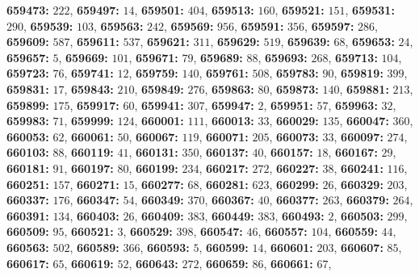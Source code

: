 \textsf{\bfseries 659473:} $222$, \textsf{\bfseries 659497:} $14$, \textsf{\bfseries 659501:} $404$, \textsf{\bfseries 659513:} $160$, \textsf{\bfseries 659521:} $151$, \textsf{\bfseries 659531:} $290$, \textsf{\bfseries 659539:} $103$, \textsf{\bfseries 659563:} $242$, \textsf{\bfseries 659569:} $956$, \textsf{\bfseries 659591:} $356$, \textsf{\bfseries 659597:} $286$, \textsf{\bfseries 659609:} $587$, \textsf{\bfseries 659611:} $537$, \textsf{\bfseries 659621:} $311$, \textsf{\bfseries 659629:} $519$, \textsf{\bfseries 659639:} $68$, \textsf{\bfseries 659653:} $24$, \textsf{\bfseries 659657:} $5$, \textsf{\bfseries 659669:} $101$, \textsf{\bfseries 659671:} $79$, \textsf{\bfseries 659689:} $88$, \textsf{\bfseries 659693:} $268$, \textsf{\bfseries 659713:} $104$, \textsf{\bfseries 659723:} $76$, \textsf{\bfseries 659741:} $12$, \textsf{\bfseries 659759:} $140$, \textsf{\bfseries 659761:} $508$, \textsf{\bfseries 659783:} $90$, \textsf{\bfseries 659819:} $399$, \textsf{\bfseries 659831:} $17$, \textsf{\bfseries 659843:} $210$, \textsf{\bfseries 659849:} $276$, \textsf{\bfseries 659863:} $80$, \textsf{\bfseries 659873:} $140$, \textsf{\bfseries 659881:} $213$, \textsf{\bfseries 659899:} $175$, \textsf{\bfseries 659917:} $60$, \textsf{\bfseries 659941:} $307$, \textsf{\bfseries 659947:} $2$, \textsf{\bfseries 659951:} $57$, \textsf{\bfseries 659963:} $32$, \textsf{\bfseries 659983:} $71$, \textsf{\bfseries 659999:} $124$, \textsf{\bfseries 660001:} $111$, \textsf{\bfseries 660013:} $33$, \textsf{\bfseries 660029:} $135$, \textsf{\bfseries 660047:} $360$, \textsf{\bfseries 660053:} $62$, \textsf{\bfseries 660061:} $50$, \textsf{\bfseries 660067:} $119$, \textsf{\bfseries 660071:} $205$, \textsf{\bfseries 660073:} $33$, \textsf{\bfseries 660097:} $274$, \textsf{\bfseries 660103:} $88$, \textsf{\bfseries 660119:} $41$, \textsf{\bfseries 660131:} $350$, \textsf{\bfseries 660137:} $40$, \textsf{\bfseries 660157:} $18$, \textsf{\bfseries 660167:} $29$, \textsf{\bfseries 660181:} $91$, \textsf{\bfseries 660197:} $80$, \textsf{\bfseries 660199:} $234$, \textsf{\bfseries 660217:} $272$, \textsf{\bfseries 660227:} $38$, \textsf{\bfseries 660241:} $116$, \textsf{\bfseries 660251:} $157$, \textsf{\bfseries 660271:} $15$, \textsf{\bfseries 660277:} $68$, \textsf{\bfseries 660281:} $623$, \textsf{\bfseries 660299:} $26$, \textsf{\bfseries 660329:} $203$, \textsf{\bfseries 660337:} $176$, \textsf{\bfseries 660347:} $54$, \textsf{\bfseries 660349:} $370$, \textsf{\bfseries 660367:} $40$, \textsf{\bfseries 660377:} $263$, \textsf{\bfseries 660379:} $264$, \textsf{\bfseries 660391:} $134$, \textsf{\bfseries 660403:} $26$, \textsf{\bfseries 660409:} $383$, \textsf{\bfseries 660449:} $383$, \textsf{\bfseries 660493:} $2$, \textsf{\bfseries 660503:} $299$, \textsf{\bfseries 660509:} $95$, \textsf{\bfseries 660521:} $3$, \textsf{\bfseries 660529:} $398$, \textsf{\bfseries 660547:} $46$, \textsf{\bfseries 660557:} $104$, \textsf{\bfseries 660559:} $44$, \textsf{\bfseries 660563:} $502$, \textsf{\bfseries 660589:} $366$, \textsf{\bfseries 660593:} $5$, \textsf{\bfseries 660599:} $14$, \textsf{\bfseries 660601:} $203$, \textsf{\bfseries 660607:} $85$, \textsf{\bfseries 660617:} $65$, \textsf{\bfseries 660619:} $52$, \textsf{\bfseries 660643:} $272$, \textsf{\bfseries 660659:} $86$, \textsf{\bfseries 660661:} $67$, 
